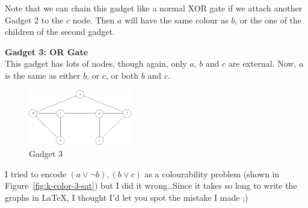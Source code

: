 \begin{description}
    Note that we can chain this gadget like a normal XOR gate if we attach
    another Gadget 2 to the $c$ node. Then $a$ will have the same colour as $b$,
    or the one of the children of the second gadget.

  \item \textbf{Gadget 3: OR Gate}\\
    This gadget has lots of nodes, though again, only $a$, $b$ and $c$ are 
    external. Now, $a$ is the same as either $b$, or $c$, or both $b$ and $c$.

    \begin{figure}[H]
      \centering
      \includegraphics[width=0.4\textwidth]{diagrams/graph13}
      \caption{Gadget 3}
      \label{fig:gadget3}
    \end{figure}
\end{description}

I tried to encode $(a \vee \neg b), (b \vee c)$ as a colourability problem (shown
in Figure~\ref{fig:k-color-3-sat}) but I did it wrong\dots Since it takes so
long to write the graphs in \LaTeX, I thought I'd let you spot the mistake I
made ;)

